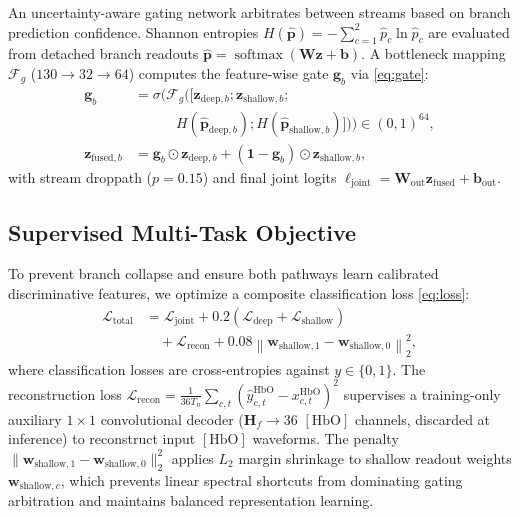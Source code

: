 \documentclass[journal]{IEEEtran}
\begin{document}
An uncertainty-aware gating network arbitrates between streams based on branch prediction confidence. Shannon entropies $H(\hat{\mathbf{p}}) = -\sum_{c=1}^2 \hat{p}_c \ln \hat{p}_c$ are evaluated from detached branch readouts $\hat{\mathbf{p}} = \operatorname{softmax}(\mathbf{W}\mathbf{z} + \mathbf{b})$. A bottleneck mapping $\mathcal{F}_g$ ($130 \to 32 \to 64$) computes the feature-wise gate $\mathbf{g}_b$ via \eqref{eq:gate}:
\begin{equation}
\begin{aligned}
\mathbf{g}_b &= \sigma\big(\mathcal{F}_g([\mathbf{z}_{\mathrm{deep},b}; \mathbf{z}_{\mathrm{shallow},b}; \\
&\qquad\quad H(\hat{\mathbf{p}}_{\mathrm{deep},b}); H(\hat{\mathbf{p}}_{\mathrm{shallow},b})])\big) \in (0, 1)^{64}, \\
\mathbf{z}_{\mathrm{fused},b} &= \mathbf{g}_b \odot \mathbf{z}_{\mathrm{deep},b} + (\mathbf{1} - \mathbf{g}_b) \odot \mathbf{z}_{\mathrm{shallow},b},
\end{aligned}
\label{eq:gate}
\end{equation}
with stream droppath ($p = 0.15$) and final joint logits $\boldsymbol{\ell}_{\mathrm{joint}} = \mathbf{W}_{\mathrm{out}} \mathbf{z}_{\mathrm{fused}} + \mathbf{b}_{\mathrm{out}}$.

\subsection{Supervised Multi-Task Objective}
To prevent branch collapse and ensure both pathways learn calibrated discriminative features, we optimize a composite classification loss \eqref{eq:loss}:
\begin{equation}
\begin{aligned}
\mathcal{L}_{\mathrm{total}} &= \mathcal{L}_{\mathrm{joint}} + 0.2\left(\mathcal{L}_{\mathrm{deep}} + \mathcal{L}_{\mathrm{shallow}}\right) \\
&\quad + \mathcal{L}_{\mathrm{recon}} + 0.08\left\|\mathbf{w}_{\mathrm{shallow},1} - \mathbf{w}_{\mathrm{shallow},0}\right\|_2^2,
\end{aligned}
\label{eq:loss}
\end{equation}
where classification losses are cross-entropies against $y \in \{0, 1\}$. The reconstruction loss $\mathcal{L}_{\mathrm{recon}} = \frac{1}{36 T_n}\sum_{c,t} (\hat{y}^{\mathrm{HbO}}_{c,t} - x^{\mathrm{HbO}}_{c,t})^2$ supervises a training-only auxiliary $1\times 1$ convolutional decoder ($\mathbf{H}_f \to 36$ $[\mathrm{HbO}]$ channels, discarded at inference) to reconstruct input $[\mathrm{HbO}]$ waveforms. The penalty $\|\mathbf{w}_{\mathrm{shallow},1} - \mathbf{w}_{\mathrm{shallow},0}\|_2^2$ applies $L_2$ margin shrinkage to shallow readout weights $\mathbf{w}_{\mathrm{shallow},c}$, which prevents linear spectral shortcuts from dominating gating arbitration and maintains balanced representation learning.
\end{document}

